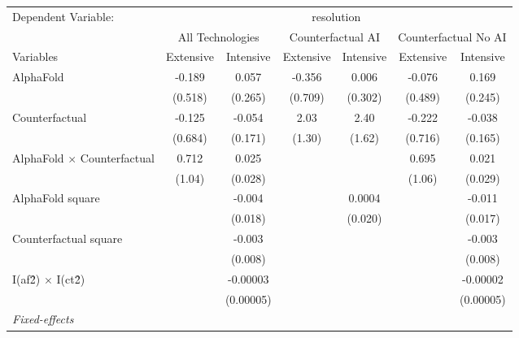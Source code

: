 \begingroup
\centering
\begin{tabular}{lcccccc}
   \tabularnewline \midrule \midrule
   Dependent Variable: & \multicolumn{6}{c}{resolution}\\
 & \multicolumn{2}{c}{All Technologies} & \multicolumn{2}{c}{Counterfactual AI} & \multicolumn{2}{c}{Counterfactual No AI} \\
\cmidrule(lr){1-1}\cmidrule(lr){2-3} \cmidrule(lr){4-5} \cmidrule(lr){6-7}
Variables & \multicolumn{1}{c}{Extensive} & \multicolumn{1}{c}{Intensive} & \multicolumn{1}{c}{Extensive} & \multicolumn{1}{c}{Intensive} & \multicolumn{1}{c}{Extensive} & \multicolumn{1}{c}{Intensive} \\
\cmidrule(lr){1-1}\cmidrule(lr){2-2} \cmidrule(lr){3-3} \cmidrule(lr){4-4} \cmidrule(lr){5-5} \cmidrule(lr){6-6} \cmidrule(lr){7-7}
   AlphaFold                          & -0.189  & 0.057     & -0.356  & 0.006   & -0.076  & 0.169\\   
                                      & (0.518) & (0.265)   & (0.709) & (0.302) & (0.489) & (0.245)\\   
   Counterfactual                     & -0.125  & -0.054    & 2.03    & 2.40    & -0.222  & -0.038\\   
                                      & (0.684) & (0.171)   & (1.30)  & (1.62)  & (0.716) & (0.165)\\   
   AlphaFold $\times$ Counterfactual  & 0.712   & 0.025     &         &         & 0.695   & 0.021\\   
                                      & (1.04)  & (0.028)   &         &         & (1.06)  & (0.029)\\   
   AlphaFold square                   &         & -0.004    &         & 0.0004  &         & -0.011\\   
                                      &         & (0.018)   &         & (0.020) &         & (0.017)\\   
   Counterfactual square              &         & -0.003    &         &         &         & -0.003\\   
                                      &         & (0.008)   &         &         &         & (0.008)\\   
   I(af\^2) $\times$ I(ct\^2)         &         & -0.00003  &         &         &         & -0.00002\\   
                                      &         & (0.00005) &         &         &         & (0.00005)\\   
   \midrule
   \emph{Fixed-effects}\\

\end{tabular}
